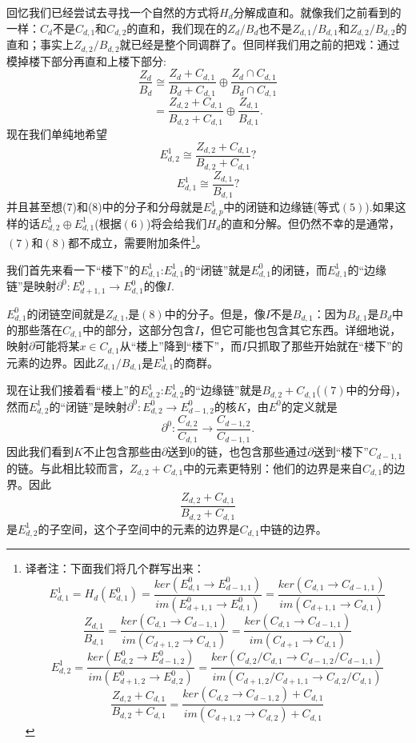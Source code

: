 \documentclass[a4paper,11pt,openany]{ctexart}
\begin{document}
回忆我们已经尝试去寻找一个自然的方式将$H_d$分解成直和。就像我们之前看到的一样：$C_d$不是$C_{d,1}$和$C_{d,2}$的直和，我们现在的$Z_d/B_d$也不是$Z_{d,1}/B_{d,1}$和$Z_{d,2}/B_{d,2}$的直和；事实上$Z_{d,2}/B_{d,2}$就已经是整个同调群了。但同样我们用之前的把戏：通过模掉楼下部分再直和上楼下部分:
\[\frac{Z_d}{B_d}\cong \frac{Z_d+C_{d,1}}{B_d+C_{d,1}}\oplus \frac{Z_d \cap C_{d,1}}{B_d\cap C_{d,1}}\]
\[=\frac{Z_{d,2}+C_{d,1}}{B_{d,2}+C_{d,1}}\oplus \frac{Z_{d,1}}{B_{d,1}}.\]
现在我们单纯地希望
\begin{equation}
  E^1_{d,2}\cong \frac{Z_{d,2}+C_{d,1}}{B_{d,2}+C_{d,1}}?
\end{equation}
\begin{equation}
  E^1_{d,1}\cong \frac{Z_{d,1}}{B_{d,1}}?
\end{equation}
并且甚至想(7)和(8)中的分子和分母就是$E_{d,p}^1$中的闭链和边缘链(等式$(5)$).如果这样的话$E^1_{d,2}\oplus E^1_{d,1}$(根据$(6)$)将会给我们$H_d$的直和分解。但仍然不幸的是通常，$(7)$和$(8)$都不成立，需要附加条件\footnote{译者注：下面我们将几个群写出来：
\[E^{1}_{d,1}=H_d(E^0_{d,1})=\frac{ker(E^0_{d,1}\to E_{d-1,1}^0)}{im(E^0_{d+1,1}\to E_{d,1}^0)}=\frac{ker(C_{d,1}\to C_{d-1,1})}{im(C_{d+1,1}\to C_{d,1})}\]
\[\frac{Z_{d,1}}{B_{d,1}}=\frac{ker(C_{d,1}\to C_{d-1,1})}{im(C_{d+1,2}\to C_{d,1})}=\frac{ker(C_{d,1}\to C_{d-1,1})}{im(C_{d+1}\to C_{d,1})}\]
\[E^1_{d,2}=\frac{ker(E^0_{d,2}\to E_{d-1,2}^0)}{im(E^0_{d+1,2}\to E_{d,2}^0)}=\frac{ker(C_{d,2}/C_{d,1}\to C_{d-1,2}/C_{d-1,1})}{im(C_{d+1,2}/C_{d+1,1}\to C_{d,2}/C_{d,1})}\]
\[\frac{Z_{d,2}+C_{d,1}}{B_{d,2}+C_{d,1}}=\frac{ker(C_{d,2}\to C_{d-1,2})+C_{d,1}}{im(C_{d+1,2}\to C_{d,2})+C_{d,1}}\]
}。



我们首先来看一下“楼下”的$E_{d,1}^1$:$E_{d,1}^1$的“闭链”就是$E_{d,1}^0$的闭链，而$E_{d,1}^1$的“边缘链”是映射$\partial^0:E_{d+1,1}^0\to E_{d,1}^0$的像$I$.

$E^0_{d,1}$的闭链空间就是$Z_{d,1}$,是$(8)$中的分子。但是，像$I$不是$B_{d,1}$：因为$B_{d,1}$是$B_d$中的那些落在$C_ {d,1}$中的部分，这部分包含$I$，但它可能也包含其它东西。详细地说，映射$\partial$可能将某$x\in C_{d,1}$从“楼上”降到“楼下”，而$I$只抓取了那些开始就在“楼下”的元素的边界。因此$Z_{d,1}/B_{d,1}$是$E^1_{d,1}$的商群。

现在让我们接着看“楼上”的$E_{d,2}^1$:$E_{d,2}^1$的“边缘链”就是$B_{d,2}+C_{d,1}$($(7)$中的分母)，然而$E_{d,2}^1$的“闭链”是映射$\partial^0:E_{d,2}^0\to E_{d-1,2}^0$的核$K$，由$E^0$的定义就是$$\partial^0:\frac{C_{d,2}}{C_{d,1}}\to\frac{C_{d-1,2}}{C_{d-1,1}}.$$
因此我们看到$K$不止包含那些由$\partial$送到$0$的链，也包含那些通过$\partial$送到“楼下”$C_{d-1,1}$的链。与此相比较而言，$Z_{d,2}+C_{d,1}$中的元素更特别：他们的边界是来自$C_{d,1}$的边界。因此
\[\frac{Z_{d,2}+C_{d,1}}{B_{d,2}+C_{d,1}}\]
是$E^1_{d,2}$的子空间，这个子空间中的元素的边界是$C_{d,1}$中链的边界。
\end{document}
